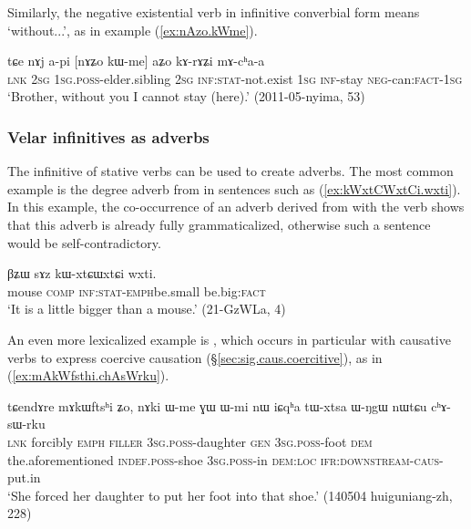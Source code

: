 Similarly, the negative existential verb  in infinitive converbial form means `without...', as in example  (\ref{ex:nAzo.kWme}).

\begin{exe}
\ex \label{ex:nAzo.kWme}
\gll tɕe nɤj a-pi [nɤʑo kɯ-me] aʑo kɤ-rɤʑi mɤ-cʰa-a \\
\textsc{lnk} \textsc{2sg} \textsc{1sg}.\textsc{poss}-elder.sibling \textsc{2sg} \textsc{inf}:\textsc{stat}-not.exist \textsc{1sg} \textsc{inf}-stay \textsc{neg}-can:\textsc{fact}-\textsc{1sg} \\
\glt `Brother, without you I cannot stay (here).' (2011-05-nyima, 53)
\end{exe}

\subsubsection{Velar infinitives as adverbs}    \label{sec:velar.inf.adverb}
The  infinitive of stative verbs can be used to create adverbs. The most common example is the degree adverb   from  in sentences such as (\ref{ex:kWxtCWxtCi.wxti}). In this example, the co-occurrence of an adverb derived from  with the verb  shows that this adverb is already fully grammaticalized, otherwise such a sentence would be self-contradictory.

\begin{exe}
\ex \label{ex:kWxtCWxtCi.wxti}
 \gll βʑɯ sɤz kɯ-xtɕɯ\redp{}xtɕi wxti. \\
 mouse \textsc{comp} \textsc{inf}:\textsc{stat}-\textsc{emph}\redp{}be.small be.big:\textsc{fact} \\
 \glt `It is a little bigger than a mouse.' (21-GzWLa, 4)
\end{exe}

An even more lexicalized example is , which occurs in particular with causative verbs to express coercive causation (§\ref{sec:sig.caus.coercitive}), as in (\ref{ex:mAkWfsthi.chAsWrku}).

\begin{exe}
\ex \label{ex:mAkWfsthi.chAsWrku}
 \gll  tɕendɤre mɤkɯftsʰi ʑo, nɤki ɯ-me ɣɯ ɯ-mi nɯ iɕqʰa tɯ-xtsa ɯ-ŋgɯ nɯtɕu cʰɤ-sɯ-rku  \\
 \textsc{lnk} forcibly \textsc{emph} \textsc{filler} \textsc{3sg}.\textsc{poss}-daughter \textsc{gen}  \textsc{3sg}.\textsc{poss}-foot \textsc{dem} the.aforementioned \textsc{indef}.\textsc{poss}-shoe \textsc{3sg}.\textsc{poss}-in \textsc{dem}:\textsc{loc} \textsc{ifr}:\textsc{downstream}-\textsc{caus}-put.in \\
\glt `She forced her daughter to put her foot into that shoe.' (140504 huiguniang-zh, 228)
\end{exe}

